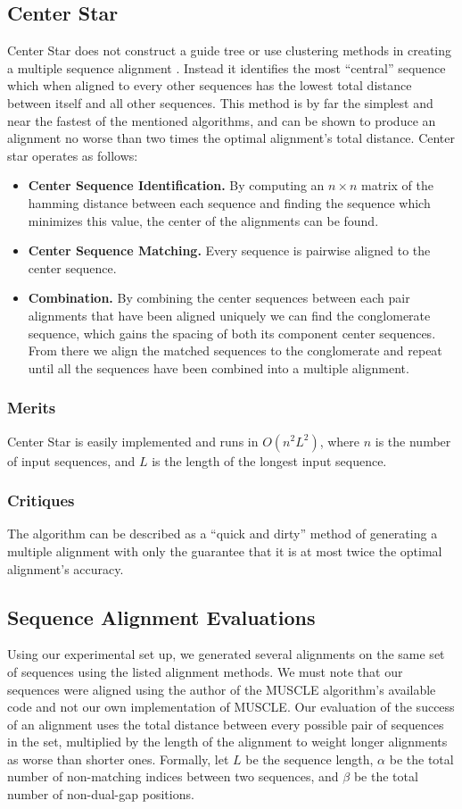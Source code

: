 \documentclass[10pt,twocolumn]{article}
\begin{document}
\subsection*{Center Star}
Center Star does not construct a guide tree or use clustering methods in creating a multiple sequence alignment \cite{gusfield1993efficient}. Instead it identifies the most ``central'' sequence which when aligned to every other sequences has the lowest total distance between itself and all other sequences. This method is by far the simplest and near the fastest of the mentioned algorithms, and can be shown to produce an alignment no worse than two times the optimal alignment's total distance. Center star operates as follows:
\begin{itemize}
\item \textbf{Center Sequence Identification.} By computing an $n \times n$ matrix of the hamming distance between each sequence and finding the sequence which minimizes this value, the center of the alignments can be found.
\item \textbf{Center Sequence Matching.} Every sequence is pairwise aligned to the center sequence.
\item \textbf{Combination.} By combining the center sequences between each pair alignments that have been aligned uniquely we can find the conglomerate sequence, which gains the spacing of both its component center sequences. From there we align the matched sequences to the conglomerate and repeat until all the sequences have been combined into a multiple alignment.
  \end{itemize}
\subsubsection*{Merits}
Center Star is easily implemented and runs in $O(n^2L^2)$, where $n$ is the number of input sequences, and $L$ is the length of the longest input sequence.

\subsubsection*{Critiques}
The algorithm can be described as a ``quick and dirty'' method of generating a multiple alignment with only the guarantee that it is at most twice the optimal alignment's accuracy.


\subsection*{Sequence Alignment Evaluations}
Using our experimental set up, we generated several alignments on the same set of sequences using the listed alignment methods. We must note that our sequences were aligned using the author of the MUSCLE algorithm's available code and not our own implementation of MUSCLE. Our evaluation of the success of an alignment uses the total distance between every possible pair of sequences in the set, multiplied by the length of the alignment to weight longer alignments as worse than shorter ones. Formally, let $L$ be the sequence length, $\alpha$ be the total number of non-matching indices between two sequences, and $\beta$ be the total number of non-dual-gap positions.
\end{document}
